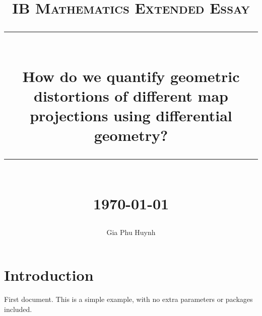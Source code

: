 \documentclass[12pt]{article}
\title{ 
    \normalsize \textsc{IB Mathematics Extended Essay} \\ [1.5cm]
	\rule{\linewidth}{0.5pt} \\
	\Large \textbf{How do we quantify geometric distortions of different map projections using differential geometry?}
	\rule{\linewidth}{1pt} \\ [0.75cm]
	\normalsize \today \vspace*{5\baselineskip}
}
\date{}
\author{Gia Phu Huynh}
\date{}
\begin{document}
\maketitle

\pagebreak
\section{Introduction}
First document. This is a simple example, with no 
extra parameters or packages included.
\end{document}
